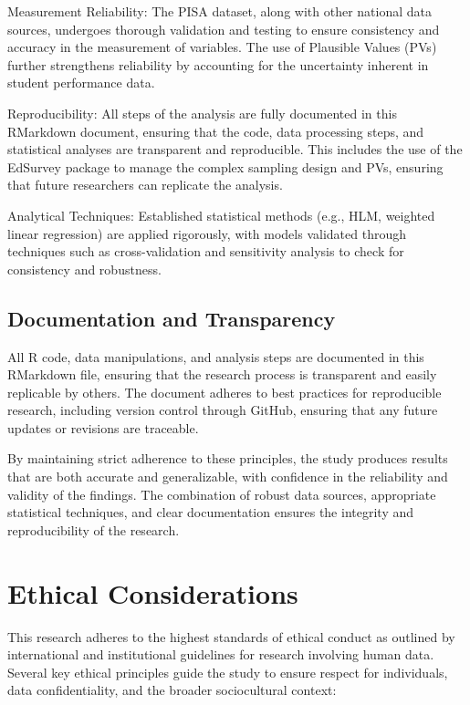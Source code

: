\documentclass[
]{article}
\begin{document}
Measurement Reliability: The PISA dataset, along with other national
data sources, undergoes thorough validation and testing to ensure
consistency and accuracy in the measurement of variables. The use of
Plausible Values (PVs) further strengthens reliability by accounting for
the uncertainty inherent in student performance data.

Reproducibility: All steps of the analysis are fully documented in this
RMarkdown document, ensuring that the code, data processing steps, and
statistical analyses are transparent and reproducible. This includes the
use of the EdSurvey package to manage the complex sampling design and
PVs, ensuring that future researchers can replicate the analysis.

Analytical Techniques: Established statistical methods (e.g., HLM,
weighted linear regression) are applied rigorously, with models
validated through techniques such as cross-validation and sensitivity
analysis to check for consistency and robustness.

\hypertarget{documentation-and-transparency}{%
\subsection{Documentation and
Transparency}\label{documentation-and-transparency}}

All R code, data manipulations, and analysis steps are documented in
this RMarkdown file, ensuring that the research process is transparent
and easily replicable by others. The document adheres to best practices
for reproducible research, including version control through GitHub,
ensuring that any future updates or revisions are traceable.

By maintaining strict adherence to these principles, the study produces
results that are both accurate and generalizable, with confidence in the
reliability and validity of the findings. The combination of robust data
sources, appropriate statistical techniques, and clear documentation
ensures the integrity and reproducibility of the research.

\hypertarget{ethical-considerations}{%
\section{Ethical Considerations}\label{ethical-considerations}}

This research adheres to the highest standards of ethical conduct as
outlined by international and institutional guidelines for research
involving human data. Several key ethical principles guide the study to
ensure respect for individuals, data confidentiality, and the broader
sociocultural context:
\end{document}
